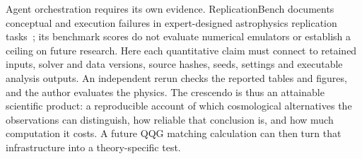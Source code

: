 Agent orchestration requires its own evidence.  ReplicationBench documents conceptual and execution failures in expert-designed astrophysics replication tasks~\cite{Ye:2025}; its benchmark scores do not evaluate numerical emulators or establish a ceiling on future research.  Here each quantitative claim must connect to retained inputs, solver and data versions, source hashes, seeds, settings and executable analysis outputs.  An independent rerun checks the reported tables and figures, and the author evaluates the physics.  The crescendo is thus an attainable scientific product: a reproducible account of which cosmological alternatives the observations can distinguish, how reliable that conclusion is, and how much computation it costs.  A future QQG matching calculation can then turn that infrastructure into a theory-specific test.

